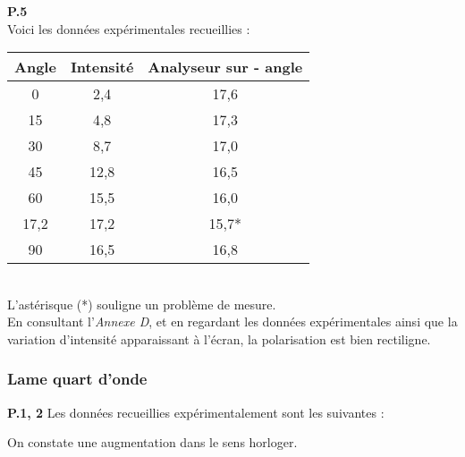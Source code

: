 \documentclass[british,french,11pt, a4paper, openany]{book}
\begin{document}
		\textbf{P.5}\\
		Voici les données expérimentales recueillies : 
		\begin{center}
			\begin{tabular}{|c|c|c|}
				\hline 
				Angle & Intensité & Analyseur sur - angle \\ 
				\hline 
				0     & 2,4        & 17,6                  \\ 
				\hline 
				15    & 4,8        & 17,3                  \\ 
				\hline 
				30    & 8,7        & 17,0                  \\ 
				\hline 
				45    & 12,8       & 16,5                  \\ 
				\hline 
				60    & 15,5       & 16,0                  \\ 
				\hline 
				17,2  & 17,2       & 15,7*                 \\ 
				\hline 
				90    & 16,5       & 16,8                  \\ 
				\hline 
			\end{tabular} 
		\end{center}\ \\
		L'astérisque (*) souligne un problème de mesure.\\
		En consultant l'\textit{Annexe D}, et en regardant les données expérimentales ainsi que la variation d'intensité apparaissant à l'écran, la polarisation est bien rectiligne.
		
		\subsubsection*{Lame quart d'onde}
		\textbf{P.1, 2}
		Les données recueillies expérimentalement sont les suivantes :
		\begin{center}
		\end{center}
		On constate une augmentation dans le sens horloger.\\
		
\end{document}
